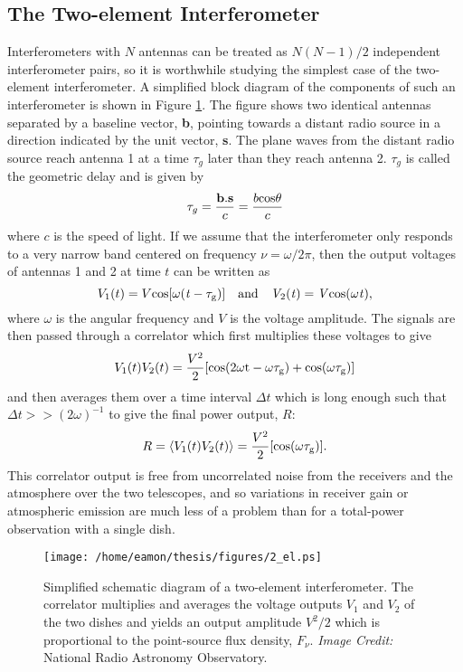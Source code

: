 \subsection{The Two-element Interferometer}\label{subsec:5}
Interferometers with $N$ antennas can be treated as $N(N-1)/2$ independent interferometer pairs, so it is worthwhile studying the simplest case of the two-element interferometer. A simplified block diagram of the components of such an interferometer is shown in Figure \ref{fig2.6}. The figure shows two identical antennas separated by a baseline vector, \textbf{b}, pointing towards a distant radio source in a direction indicated by the unit vector, \textbf{s}. The plane waves from the distant radio source reach antenna 1 at a time $\tau _g$ later than they reach antenna 2. $\tau _g$ is called the geometric delay and is given by
\begin{equation}
\tau _{g}=\frac{\textbf{b}.\textbf{s}}{c}=\frac{b\rm{cos}\theta}{c}
\end{equation}
where $c$ is the speed of light. If we assume that the interferometer only responds to a very narrow band centered on frequency $\nu=\omega /2\pi$, then the output voltages of antennas 1 and 2 at time $t$ can be written as 
\begin{equation}
V_1(t)=V\rm{cos}[\omega(\mathit{t}-\tau _g)] \ \ \ \rm{and} \ \ \ \mathit{V_{\rm{2}}(t)=V\rm{cos}(\omega \mathit{t})},
\end{equation}
where $\omega$ is the angular frequency and $V$ is the voltage amplitude. The signals are then passed through a correlator which first multiplies these voltages to give
\begin{equation}
V_1(t) V_2(t)=\frac{V^2}{2}[\rm{cos(2\omega t -\omega \tau _g)+\rm{cos}(\omega \tau _g)}]
\end{equation}
and then averages them over a time interval $\Delta t$ which is long enough such that $\Delta t >> (2\omega)^{-1}$ to give the final power output, $R$:
\begin{equation}
R=\langle V_1(t)V_2(t)\rangle = \frac{V^2}{2}[\rm{cos}(\omega \tau _g)].
\end{equation}
This correlator output is free from uncorrelated noise from the receivers and the atmosphere over the two telescopes, 
and so variations in receiver gain or atmospheric emission are much less of a problem than for a total-power observation with a single dish. 

\begin{figure}[hbt!]
\centering 
          \texttt{[image: /home/eamon/thesis/figures/2\_el.ps]}
\caption[Simplified schematic diagram of a two-element interferometer]{Simplified schematic diagram of a two-element interferometer. The correlator multiplies and averages the voltage outputs $V_1$ and $V_2$ of the two dishes and yields an output amplitude $V^2/2$ which is proportional to the point-source flux density, $F_{\nu}$. \textit{Image Credit:} National Radio Astronomy Observatory.}
\label{fig2.6}
\end{figure}

